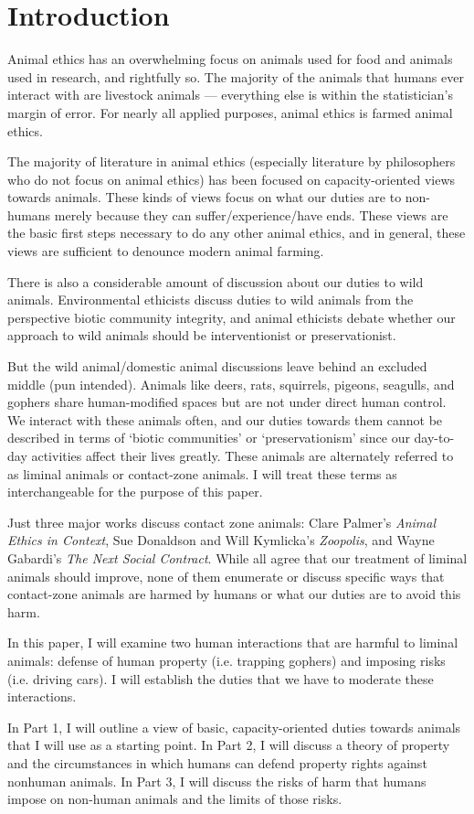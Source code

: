 \chapter*{Introduction}

Animal ethics has an overwhelming focus on animals used for food and animals
used in research, and rightfully so. The majority of the animals that humans
ever interact with are livestock animals --- everything else is within the
statistician’s margin of error.\autocite[206]{sunstein_nussbaum_debates} For nearly all
applied purposes, animal ethics is farmed animal ethics.

The majority of literature in animal ethics (especially literature by
philosophers who do not focus on animal ethics) has been focused on
capacity-oriented views towards animals. These kinds of views focus on what our
duties are to non-humans merely because they can suffer/experience/have ends.
These views are the basic first steps necessary to do any other animal ethics,
and in general, these views are sufficient to denounce modern animal farming.

There is also a considerable amount of discussion about our duties to wild
animals. Environmental ethicists discuss duties to wild animals from the
perspective biotic community integrity, and animal ethicists debate whether our
approach to wild animals should be interventionist or preservationist.

But the wild animal/domestic animal discussions leave behind an excluded middle
(pun intended). Animals like deers, rats, squirrels, pigeons, seagulls, and
gophers share human-modified spaces but are not under direct human control. We
interact with these animals often, and our duties towards them cannot be
described in terms of ‘biotic communities’ or ‘preservationism’ since our
day-to-day activities affect their lives greatly. These animals are alternately
referred to as liminal animals or contact-zone animals. I will
treat these terms as interchangeable for the purpose of this paper.

Just three major works discuss contact zone animals: Clare Palmer’s
\emph{Animal Ethics in Context}, Sue Donaldson and Will Kymlicka’s
\emph{Zoopolis}, and Wayne Gabardi’s \emph{The Next Social Contract}.  While
all agree that our treatment of liminal animals should improve, none of them
enumerate or discuss specific ways that contact-zone animals are harmed by
humans or what our duties are to avoid this harm.

In this paper, I will examine two human interactions that are harmful to
liminal animals: defense of human property (i.e. trapping gophers) and imposing
risks (i.e. driving cars). I will establish the duties that we have to moderate
these interactions.

In Part 1, I will outline a view of basic, capacity-oriented duties towards
animals that I will use as a starting point. In Part 2, I will discuss a theory
of property and the circumstances in which humans can defend property rights
against nonhuman animals. In Part 3, I will discuss the risks of harm that
humans impose on non-human animals and the limits of those risks.
